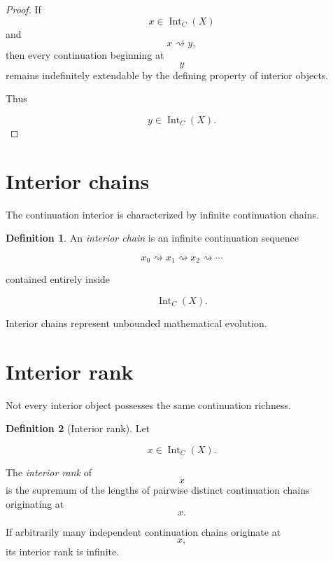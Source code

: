 \documentclass[13pt,openany]{book}
\theoremstyle{plain}
\theoremstyle{definition}
\newtheorem{definition}{Definition}[chapter]
\begin{document}
\begin{proof}

If
\[
x\in\operatorname{Int}_C(X)
\]
and
\[
x\rightsquigarrow y,
\]
then every continuation beginning at
\[
y
\]
remains indefinitely extendable by the defining property of interior objects.

Thus

\[
y\in\operatorname{Int}_C(X).
\]

\end{proof}


\section{Interior chains}

The continuation interior is characterized by infinite continuation chains.

\begin{definition}

An \emph{interior chain} is an infinite continuation sequence

\[
x_0
\rightsquigarrow
x_1
\rightsquigarrow
x_2
\rightsquigarrow
\cdots
\]

contained entirely inside

\[
\operatorname{Int}_C(X).
\]

\end{definition}

Interior chains represent unbounded mathematical evolution.


\section{Interior rank}

Not every interior object possesses the same continuation richness.

\begin{definition}[Interior rank]

Let

\[
x\in\operatorname{Int}_C(X).
\]

The \emph{interior rank} of
\[
x
\]
is the supremum of the lengths of pairwise distinct continuation chains
originating at
\[
x.
\]

If arbitrarily many independent continuation chains originate at
\[
x,
\]
its interior rank is infinite.

\end{definition}
\end{document}
